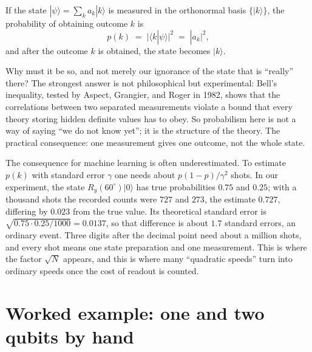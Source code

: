 \begin{definisi}
If the state $|\psi\rangle=\sum_k a_k|k\rangle$ is measured in the orthonormal basis
$\{|k\rangle\}$, the probability of obtaining outcome $k$ is
\begin{equation}
p(k) \;=\; \bigl|\langle k|\psi\rangle\bigr|^{2} \;=\; |a_k|^{2},
\end{equation}
and after the outcome $k$ is obtained, the state becomes $|k\rangle$.
\end{definisi}

Why must it be so, and not merely our ignorance of the state that is ``really'' there?
The strongest answer is not philosophical but experimental: Bell's inequality, tested by
Aspect, Grangier, and Roger in 1982, shows that the correlations between two separated
measurements violate a bound that every theory storing hidden definite values has to obey.
So probabilism here is not a way of saying ``we do not know yet''; it is the structure of
the theory. The practical consequence: one measurement gives one outcome, not the whole
state.


The consequence for machine learning is often underestimated. To estimate $p(k)$ with
standard error $\gamma$ one needs about $p(1-p)/\gamma^{2}$ shots. In our experiment, the
state $R_y(60^\circ)|0\rangle$ has true probabilities $0.75$ and $0.25$; with a thousand
shots the recorded counts were $727$ and $273$, the estimate $0.727$, differing by
$0.023$ from the true value. Its theoretical standard error is
$\sqrt{0.75\cdot 0.25/1000}=0.0137$, so that difference is about $1.7$ standard errors, an
ordinary event. Three digits after the decimal point need about a million shots, and every
shot means one state preparation and one measurement. This is where the factor $\sqrt{N}$
appears, and this is where many ``quadratic speeds'' turn into ordinary speeds once the
cost of readout is counted.

\section{Worked example: one and two qubits by hand}

